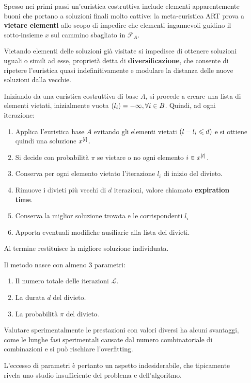 \documentclass[\main/main.tex]{subfiles}
\providecommand{\f}{\mathcal{F}}
\providecommand{\fa}{\f_A}
\begin{document}
\begin{definition}
    Spesso nei primi passi un’euristica costruttiva include elementi apparentemente buoni che portano a soluzioni finali molto cattive: la meta-euristica ART prova a \textbf{vietare elementi} allo scopo di impedire che elementi ingannevoli guidino il sotto-insieme \(x\) sul cammino sbagliato in \(\fa\).
    
    Vietando elementi delle soluzioni già visitate si impedisce di ottenere soluzioni uguali o simili ad esse, proprietà detta di \textbf{diversificazione}, che consente di ripetere l'euristica quasi indefinitivamente e modulare la distanza delle nuove soluzioni dalla vecchie.
    
    Iniziando da una euristica costruttiva di base \(A\), si procede a creare una lista di elementi vietati, inizialmente vuota \(\left(l_i\right) = -\infty, \forall i \in B\). Quindi, ad ogni iterazione:
    \begin{enumerate}
        \item Applica l'euristica base \(A\) evitando gli elementi vietati \(\left(l - l_i \leqslant d\right)\) e si ottiene quindi una soluzione \(x^{\left[l\right]}\).
        \item Si decide con probabilità \(\pi\) se vietare o no ogni elemento \(i \in x^{\left[l\right]}\).
        \item Conserva per ogni elemento vietato l'iterazione \(l_i\) di inizio del divieto.
        \item Rimuove i divieti più vecchi di \(d\) iterazioni, valore chiamato \textbf{expiration time}.
        \item Conserva la miglior soluzione trovata e le corrispondenti \(l_i\)
        \item Apporta eventuali modifiche ausiliarie alla lista dei divieti.
    \end{enumerate}
    
    Al termine restituisce la migliore soluzione individuata.
\end{definition}
\begin{observation}
    Il metodo nasce con almeno \(3\) parametri:
    
    \begin{enumerate}
        \item Il numero totale delle iterazioni \(\mathcal{L}\).
        \item La durata \(d\) del divieto.
        \item La probabilità \(\pi\) del divieto.
    \end{enumerate}
    
    Valutare sperimentalmente le prestazioni con valori diversi ha alcuni svantaggi, come le lunghe fasi sperimentali causate dal numero combinatoriale di combinazioni e si può rischiare l'overfitting.
    
    L'eccesso di parametri è pertanto un aspetto indesiderabile, che tipicamente rivela uno studio insufficiente del problema e dell'algoritmo.
\end{observation}
\end{document}
